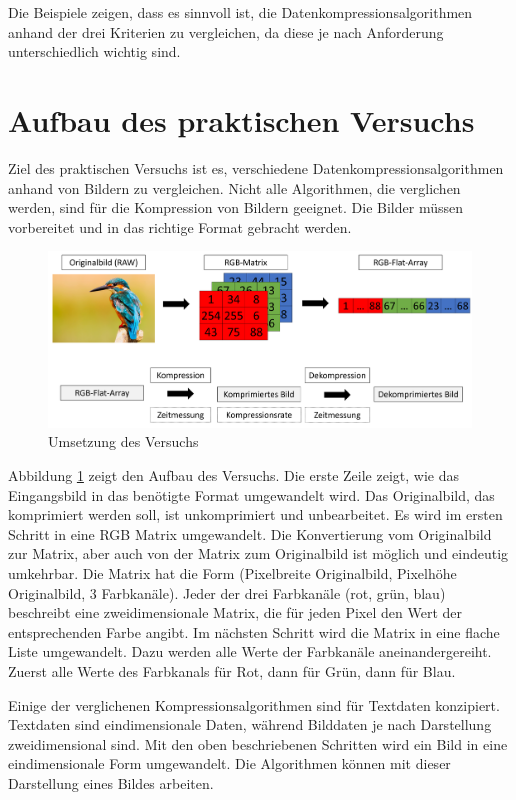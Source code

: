 \documentclass[conference]{IEEEtran}
\begin{document}
Die Beispiele zeigen, dass es sinnvoll ist, die Datenkompressionsalgorithmen 
anhand der drei Kriterien zu vergleichen, da diese je nach Anforderung unterschiedlich 
wichtig sind.


\section{Aufbau des praktischen Versuchs}

Ziel des praktischen Versuchs ist es, verschiedene Datenkompressionsalgorithmen 
anhand von Bildern zu vergleichen. 
Nicht alle Algorithmen, die verglichen werden, sind für die Kompression von Bildern geeignet. 
Die Bilder müssen vorbereitet und in das richtige Format gebracht werden.

\begin{figure}[h]
  \centering
  \includegraphics[width=\columnwidth]{./images/Idea.png}
  \caption{Umsetzung des Versuchs}
  \label{fig:idea}
\end{figure}

Abbildung \ref{fig:idea} zeigt den Aufbau des Versuchs.
Die erste Zeile zeigt, wie das Eingangsbild in das benötigte Format umgewandelt
wird.
Das Originalbild, das komprimiert werden soll, ist unkomprimiert und unbearbeitet. 
Es wird im ersten Schritt in eine RGB Matrix umgewandelt.
Die Konvertierung vom Originalbild zur Matrix, aber auch von der Matrix zum Originalbild 
ist möglich und eindeutig umkehrbar.
Die Matrix hat die Form (Pixelbreite Originalbild, Pixelhöhe Originalbild,
3 Farbkanäle).
Jeder der drei Farbkanäle (rot, grün, blau) beschreibt eine zweidimensionale Matrix,
die für jeden Pixel den Wert der entsprechenden Farbe angibt.
Im nächsten Schritt wird die Matrix in eine flache Liste umgewandelt.
Dazu werden alle Werte der Farbkanäle aneinandergereiht.
Zuerst alle Werte des Farbkanals für Rot, dann für Grün, dann für Blau.

Einige der verglichenen Kompressionsalgorithmen sind für Textdaten konzipiert.
Textdaten sind eindimensionale Daten, während Bilddaten je nach Darstellung
zweidimensional sind.
Mit den oben beschriebenen Schritten wird ein Bild in eine eindimensionale
Form umgewandelt.
Die Algorithmen können mit dieser Darstellung eines Bildes arbeiten.
\end{document}
